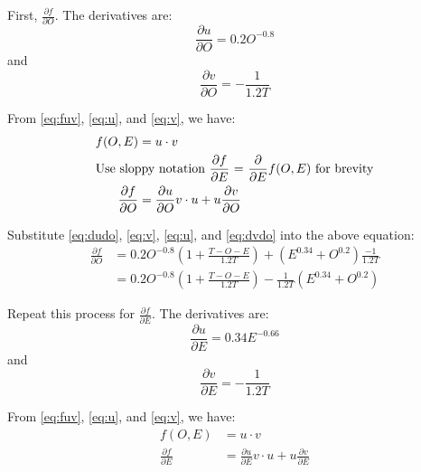 \documentclass{article}
\begin{document}
First, $\frac{\partial f}{\partial O}$. The derivatives are:
\begin{equation}\label{eq:dudo}
  \frac{\partial u}{\partial O} = 0.2O^{-0.8}
\end{equation}
and
\begin{equation}\label{eq:dvdo}
  \frac{\partial v}{\partial O} = -\frac{1}{1.2T}
\end{equation}

From \eqref{eq:fuv}, \eqref{eq:u}, and \eqref{eq:v}, we have:
\begin{equation}
  \begin{split}
    f(O, E) & = u \cdot v \\
    \span \text{Use sloppy notation $\frac{\partial f}{\partial E}$ = $\frac{\partial}{\partial E}f(O,E)$ for brevity} \\
    \frac{\partial f}{\partial O} & = \frac{\partial u}{\partial O}v \cdot u + u\frac{\partial v}{\partial O}
  \end{split}
\end{equation}

Substitute \eqref{eq:dudo}, \eqref{eq:v}, \eqref{eq:u}, and \eqref{eq:dvdo} into the above equation:
\begin{equation}\label{eq:dfdo}
  \begin{split}
  \frac{\partial f}{\partial O} & = 0.2O^{-0.8}\left(1 + \frac{T - O - E}{1.2T}\right) + \left(E^{0.34} + O^{0.2}\right)\frac{-1}{1.2T} \\
  & = 0.2O^{-0.8}\left(1 + \frac{T - O - E}{1.2T}\right) - \frac{1}{1.2T}\left(E^{0.34} + O^{0.2}\right)
  \end{split}
\end{equation}

Repeat this process for $\frac{\partial f}{\partial E}$. The derivatives are:
\begin{equation}\label{eq:dude}
  \frac{\partial u}{\partial E} = 0.34E^{-0.66}
\end{equation}
and
\begin{equation}\label{eq:dvde}
  \frac{\partial v}{\partial E} = -\frac{1}{1.2T}
\end{equation}

From \eqref{eq:fuv}, \eqref{eq:u}, and \eqref{eq:v}, we have:
\begin{equation}
  \begin{split}
    f(O, E) & = u \cdot v \\
    \frac{\partial f}{\partial E} & = \frac{\partial u}{\partial E}v \cdot u + u\frac{\partial v}{\partial E}
  \end{split}
\end{equation}
\end{document}
